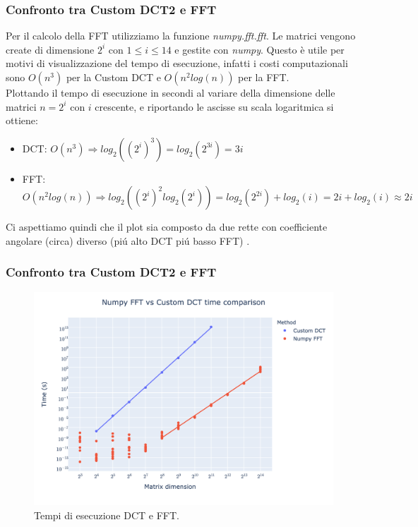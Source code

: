 \documentclass{beamer}
\begin{document}
\begin{frame}
	\frametitle{Confronto tra Custom DCT2 e FFT}
	Per il calcolo della FFT utilizziamo la funzione \textit{numpy.fft.fft}. Le matrici vengono create di dimensione $2^i$ con $1\leq i \leq 14$ e gestite con \textit{numpy}. Questo è utile per motivi di visualizzazione del tempo di esecuzione, infatti i costi computazionali sono $O(n^3)$ per la Custom DCT e $O(n^2log(n))$ per la FFT.\\
	Plottando il tempo di esecuzione in secondi al variare della dimensione delle matrici $n = 2^i$ con $i$ crescente, e riportando le ascisse su scala logaritmica si ottiene:\\
	\begin{itemize}
		\item DCT: $O(n^3) \Rightarrow log_2((2^i)^3) =  log_2(2^{3i}) = 3i $
		\item FFT: $O(n^2log(n)) \Rightarrow log_2((2^i)^2 log_2(2^i)) =  log_2(2^{2i}) + log_2(i) = 2i + log_2(i) \approx 2i$
	\end{itemize}
	Ci aspettiamo quindi che il plot sia composto da due rette con coefficiente angolare (circa) diverso (pi\'u alto DCT pi\'u basso FFT) .
\end{frame}


\begin{frame}
\frametitle{Confronto tra Custom DCT2 e FFT}

	\begin{figure}
		\includegraphics[width=1\textheight]{assets/dct2.png}
		\caption{Tempi di esecuzione DCT e FFT.}
		\label{fig:dct2}
	\end{figure}

\end{frame}
\end{document}
